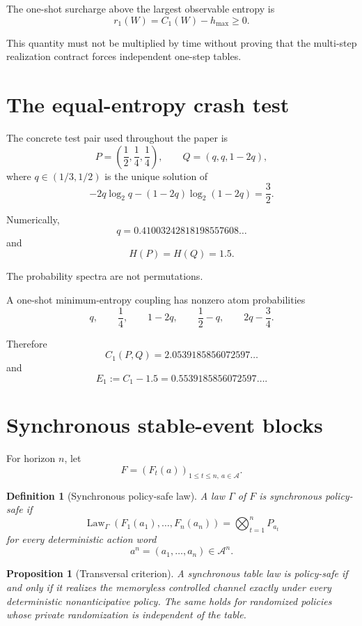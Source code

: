 \documentclass[11pt,a4paper]{article}
\newtheorem{proposition}[theorem]{Proposition}
\newtheorem{definition}[theorem]{Definition}
\newcommand{\Law}{\operatorname{Law}}
\newcommand{\cA}{\mathcal A}
\newcommand{\1}{\mathbf 1}
\begin{document}
The one-shot surcharge above the largest observable entropy is
\[
r_1(W)
=
C_1(W)-h_{\max}\ge0.
\tag{4.4}
\]

This quantity must not be multiplied by time without proving that the
multi-step realization contract forces independent one-step tables.


\section{The equal-entropy crash test}

The concrete test pair used throughout the paper is
\[
P=
\left(
\frac12,\frac14,\frac14
\right),
\qquad
Q=(q,q,1-2q),
\tag{5.1}
\]
where \(q\in(1/3,1/2)\) is the unique solution of
\[
-2q\log_2q-(1-2q)\log_2(1-2q)
=
\frac32.
\tag{5.2}
\]

Numerically,
\[
q
=
0.41003242818198557608\ldots
\tag{5.3}
\]
and
\[
H(P)=H(Q)=1.5.
\tag{5.4}
\]

The probability spectra are not permutations.

A one-shot minimum-entropy coupling has nonzero atom probabilities
\[
q,\qquad
\frac14,\qquad
1-2q,\qquad
\frac12-q,\qquad
2q-\frac34.
\tag{5.5}
\]

Therefore
\[
\boxed{
C_1(P,Q)
=
2.0539185856072597\ldots
}
\tag{5.6}
\]
and
\[
E_1
:=
C_1-1.5
=
0.5539185856072597\ldots.
\tag{5.7}
\]


\section{Synchronous stable-event blocks}

For horizon \(n\), let
\[
F=(F_t(a))_{1\le t\le n,\ a\in\cA}.
\]

\begin{definition}[Synchronous policy-safe law]
A law \(\Gamma\) of \(F\) is synchronous policy-safe if
\[
\Law_\Gamma
\left(
F_1(a_1),\ldots,F_n(a_n)
\right)
=
\bigotimes_{t=1}^nP_{a_t}
\tag{6.1}
\]
for every deterministic action word
\[
a^n=(a_1,\ldots,a_n)\in\cA^n.
\]
\end{definition}

\begin{proposition}[Transversal criterion]
A synchronous table law is policy-safe if and only if it realizes the
memoryless controlled channel exactly under every deterministic
nonanticipative policy.
The same holds for randomized policies whose private randomization is
independent of the table.
\end{proposition}
\end{document}
